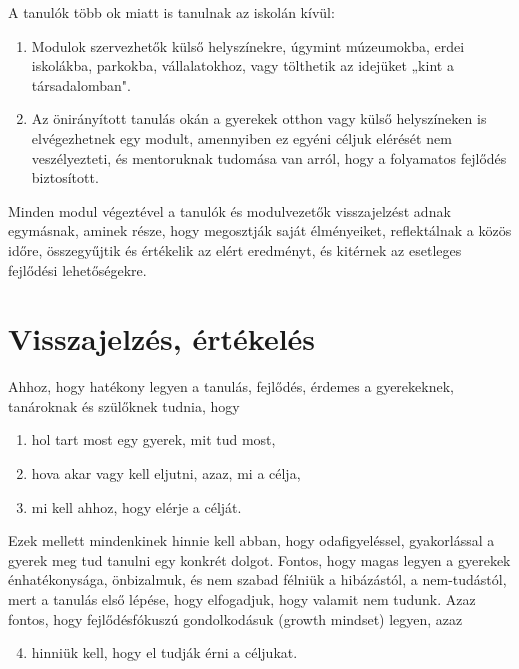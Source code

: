 A tanulók több ok miatt is tanulnak az iskolán kívül:
\begin{enumerate}
\item Modulok szervezhetők külső helyszínekre, úgymint múzeumokba, erdei iskolákba, parkokba, vállalatokhoz, vagy tölthetik az idejüket „kint a társadalomban".

\item Az önirányított tanulás okán a gyerekek otthon vagy külső helyszíneken is elvégezhetnek egy modult, amennyiben ez egyéni céljuk elérését nem veszélyezteti, és mentoruknak tudomása van arról, hogy a folyamatos fejlődés biztosított.
\end{enumerate}

Minden modul végeztével a tanulók és modulvezetők visszajelzést adnak egymásnak, aminek része, hogy megosztják saját élményeiket, reflektálnak a közös időre, összegyűjtik és értékelik az elért eredményt, és kitérnek az esetleges fejlődési lehetőségekre.

\section{Visszajelzés, értékelés}
\label{sec:ertekeles}
Ahhoz, hogy hatékony legyen a tanulás, fejlődés, érdemes a gyerekeknek, tanároknak és szülőknek tudnia, hogy
\begin{enumerate}
\item hol tart most egy gyerek, mit tud most,
\item hova akar vagy kell eljutni, azaz, mi a célja,
\item mi kell ahhoz, hogy elérje a célját.
\end{enumerate}
Ezek mellett mindenkinek hinnie kell abban, hogy odafigyeléssel, gyakorlással a gyerek meg tud tanulni egy konkrét dolgot. Fontos, hogy magas legyen a gyerekek énhatékonysága, önbizalmuk, és nem szabad félniük a hibázástól, a nem-tudástól, mert a tanulás első lépése, hogy elfogadjuk, hogy valamit nem tudunk. Azaz fontos, hogy fejlődésfókuszú gondolkodásuk (growth mindset) \citep{growthmindset} legyen, azaz
\begin{enumerate}
  \setcounter{enumi}{3}
  \item hinniük kell, hogy el tudják érni a céljukat.
\end{enumerate}


